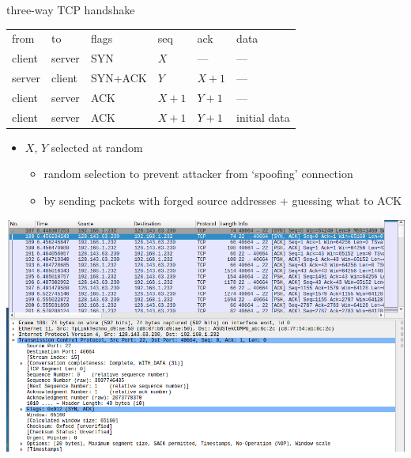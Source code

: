 \begin{frame}{three-way TCP handshake}
\begin{tabular}{l@{$\rightarrow$}l|llll}
from & to & flags & seq & ack & data\\
client & server & SYN & $X$ & --- & ---\\
server & client & SYN+ACK & $Y$ & $X+1$ & ---\\
client & server & ACK & $X+1$ & $Y+1$ & ---\\
client & server & ACK & $X+1$ & $Y+1$ & initial data  \\
\end{tabular}
\begin{itemize}
\item $X$, $Y$ selected at random
    \begin{itemize}
    \item random selection to prevent attacker from `spoofing' connection
    \item by sending packets with forged source addresses + guessing what to ACK
    \end{itemize}
\end{itemize}
\end{frame}

\begin{frame}
\includegraphics[width=\textwidth]{../sockets/tcp-handshake-wireshark}
\end{frame}

